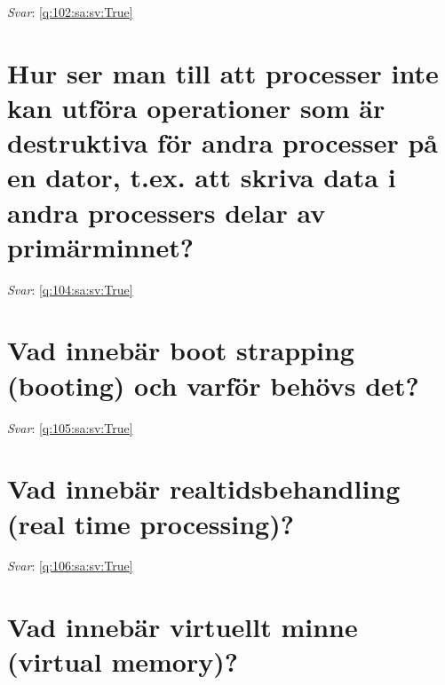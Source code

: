 \documentclass[a4paper,11pt,oneside]{book}
\begin{document}
\begin{sloppypar}
\textit{Svar}: \autoref{q:102:sa:sv:True}



\section{Hur ser man till att processer inte kan utf\"ora operationer som \"ar destruktiva f\"or andra processer p\r{a} en dator, t.ex. att skriva data i andra processers delar av prim\"arminnet?}

\label{q:104:sa:sv:False}

\vspace{2cm}

\noindent\makebox[\textwidth]{\hrulefill}

\vspace{1cm}

\textit{Svar}: \autoref{q:104:sa:sv:True}



\section{Vad inneb\"ar boot strapping (booting) och varf\"or beh\"ovs det?}

\label{q:105:sa:sv:False}

\vspace{2cm}

\noindent\makebox[\textwidth]{\hrulefill}

\vspace{1cm}

\textit{Svar}: \autoref{q:105:sa:sv:True}



\section{Vad inneb\"ar realtidsbehandling (real time processing)?}

\label{q:106:sa:sv:False}

\vspace{2cm}

\noindent\makebox[\textwidth]{\hrulefill}

\vspace{1cm}

\textit{Svar}: \autoref{q:106:sa:sv:True}



\section{Vad inneb\"ar virtuellt minne (virtual memory)?}


\end{sloppypar}
\end{document}
